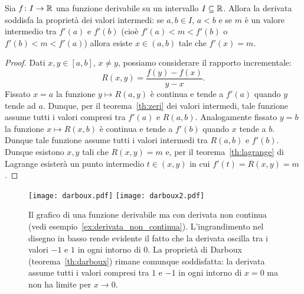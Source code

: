 \begin{theorem}
  \label{th:darboux}%
  Sia $f\colon I \to {\mathbb R}$ una funzione derivabile su un intervallo $I\subseteq {\mathbb R}$.
  Allora la derivata soddisfa la proprietà dei valori intermedi:
  se $a,b\in I$, $a<b$ e se $m$ è un valore intermedio tra 
  $f'(a)$ e $f'(b)$ (cioè $f'(a) < m < f'(b)$ o $f'(b) < m < f'(a)$)
  allora esiste $x\in(a,b)$ tale che $f'(x) = m$. 
\end{theorem}
\begin{proof}
Dati $x,y\in [a,b]$, $x\neq y$, possiamo considerare 
il rapporto incrementale:
  \[
    R(x,y) = \frac{f(y)-f(x)}{y-x}.
  \]
Fissato $x=a$ la funzione $y\mapsto R(a,y)$ è continua e tende a $f'(a)$
quando $y$ tende ad $a$.
Dunque, per il teorema~\ref{th:zeri} dei valori intermedi,
tale funzione assume tutti i valori compresi tra $f'(a)$ e 
$R(a,b)$. Analogamente fissato $y=b$ la funzione $x\mapsto R(x,b)$ 
è continua e tende a $f'(b)$ quando $x$ tende a $b$.
Dunque tale funzione assume tutti i valori intermedi 
tra $R(a,b)$ e $f'(b)$. 
Dunque esistono $x,y$ tali 
che $R(x,y)=m$ e, per il teorema~\ref{th:lagrange}
di Lagrange
esisterà un punto intermedio $t\in(x,y)$ in cui 
$f'(t)=R(x,y) = m$.
\end{proof}

\newsavebox{\qrdarboux}%
\begin{figure}
  \centering\texttt{[image: darboux.pdf]}
  \centering\texttt{[image: darboux2.pdf]}

  \caption{Il grafico di una funzione derivabile ma con 
    derivata non continua (vedi esempio~\ref{ex:derivata_non_continua}).
    L'ingrandimento nel disegno in basso rende evidente 
    il fatto che la derivata oscilla tra i valori 
    $-1$ e $1$ in ogni intorno di $0$.
    La proprietà di Darboux (teorema~\ref{th:darboux})
    rimane comunque soddisfatta: la derivata assume tutti i valori 
    compresi tra $1$ e $-1$ in ogni intorno di $x=0$ ma 
    non ha limite per $x\to 0$.\\\\
    \usebox{\qrdarboux}
}
\end{figure}


